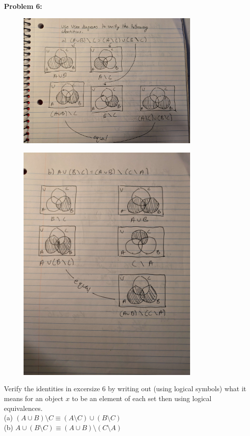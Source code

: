 \textbf{Problem 6:}
\begin{figure}[H]
    \centering
    \includegraphics[width=0.8\textwidth]{images/1.2/4.jpg}
\end{figure}
\begin{figure}[H]
    \centering
    \includegraphics[width=0.8\textwidth]{images/1.2/5.jpg}
\end{figure}

\begin{tcolorbox}[title=Problem 7, breakable]
Verify the identities in excersize $6$ by writing out (using logical symbols) what 
it means for an object $x$ to be an element of each set then using logical
equivalences. \\
(a) $(A \cup B) \setminus C \equiv (A \setminus C) \cup (B \setminus C)$ \\
(b) $A \cup (B \setminus C) \equiv (A \cup B) \setminus (C \setminus A)$
\end{tcolorbox}

